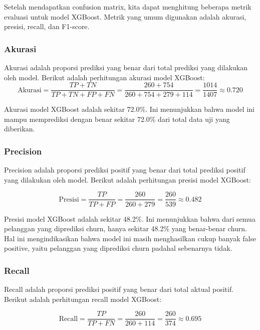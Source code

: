 Setelah mendapatkan confusion matrix, kita dapat menghitung beberapa metrik evaluasi untuk model XGBoost. Metrik yang umum digunakan adalah akurasi, presisi, recall, dan F1-score.

\subsubsection*{Akurasi}
Akurasi adalah proporsi prediksi yang benar dari total prediksi yang dilakukan oleh model. Berikut adalah perhitungan akurasi model XGBoost:
\begin{equation}
    \text{Akurasi} = \frac{TP + TN}{TP + TN + FP + FN} = \frac{260 + 754}{260 + 754 + 279 + 114} = \frac{1014}{1407} \approx 0.720
\end{equation}

Akurasi model XGBoost adalah sekitar 72.0\%. Ini menunjukkan bahwa model ini mampu memprediksi dengan benar sekitar 72.0\% dari total data uji yang diberikan.

\subsubsection*{Precision}
Precision adalah proporsi prediksi positif yang benar dari total prediksi positif yang dilakukan oleh model. Berikut adalah perhitungan presisi model XGBoost:

\begin{equation}
    \text{Presisi} = \frac{TP}{TP + FP} = \frac{260}{260 + 279} = \frac{260}{539} \approx 0.482
\end{equation}

Presisi model XGBoost adalah sekitar 48.2\%. Ini menunjukkan bahwa dari semua pelanggan yang diprediksi churn, hanya sekitar 48.2\% yang benar-benar churn. Hal ini mengindikasikan bahwa model ini masih menghasilkan cukup banyak false positive, yaitu pelanggan yang diprediksi churn padahal sebenarnya tidak.

\subsubsection*{Recall}
Recall adalah proporsi prediksi positif yang benar dari total aktual positif. Berikut adalah perhitungan recall model XGBoost:

\begin{equation}
    \text{Recall} = \frac{TP}{TP + FN} = \frac{260}{260 + 114} = \frac{260}{374} \approx 0.695
\end{equation}


